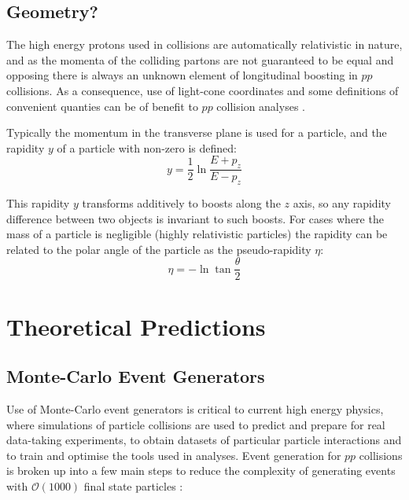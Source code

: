 	\subsection{Geometry?}
	\label{t:geometry}
	
	The high energy protons used in collisions are automatically relativistic in nature, and as the momenta of the colliding partons are not guaranteed to be equal and opposing there is always an unknown element of longitudinal boosting in $pp$ collisions. As a consequence, use of light-cone coordinates and some definitions of convenient quanties can be of benefit to $pp$ collision analyses \cite{lightcone-all-that}.
	
	Typically the momentum in the transverse plane \pt is used for a particle, and the rapidity $y$ of a particle with non-zero \pt is defined:
	\begin{equation}
	y = \frac{1}{2}\ln\frac{E+p_z}{E- p_z}
	\end{equation}  
	
	This rapidity $y$ transforms additively to boosts along the $z$ axis, so any rapidity difference between two objects is invariant to such boosts. For cases where the mass of a particle is negligible (highly relativistic particles) the rapidity can be related to the polar angle of the particle as the pseudo-rapidity $\eta$:
	\begin{equation}
	\eta = -\ln\tan\frac{\theta}{2}
	\end{equation}

\section{Theoretical Predictions}


	\subsection{Monte-Carlo Event Generators}
	
		Use of Monte-Carlo event generators is critical to current high energy physics, where simulations of particle collisions are used to predict and prepare for real data-taking experiments, to obtain datasets of particular particle interactions and to train and optimise the tools used in analyses. Event generation for $pp$ collisions is broken up into a few main steps to reduce the complexity of generating events with $\mathcal{O}(1000)$ final state particles \cite{monte-carlo}:
		
